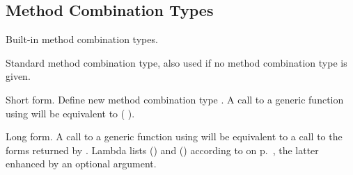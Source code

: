 \subsection[Method Combi- nation Types]{Method Combination Types} 
\label{section:Method Combination Types}
\begin{LIST}{1cm}

  {
  Built-in method combination types.
  }

  {
  Standard method combination type, also used if no method combination
  type is given. 
  }

  {
  Short form. Define new method combination type
  . A call to a generic function using
   will be equivalent to (
  ). 
  }

  {
  Long form. A call to a generic function using  will be
  equivalent to a call to the forms returned by .  Lambda
  lists () and ()
  according to  on p.\ \pageref{section:Functions}, the
  latter enhanced by an optional  argument. 
  }

\end{LIST}


